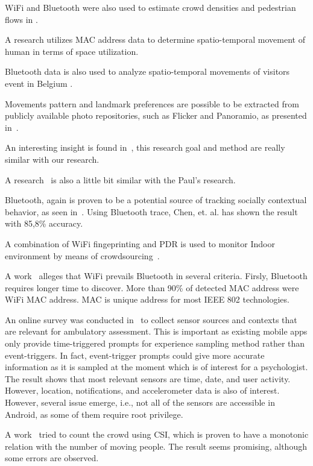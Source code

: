 \documentclass{article}
\begin{document}
WiFi and Bluetooth were also used to estimate crowd densities and pedestrian flows in \cite{thesis011}.

A research \cite{thesis017} utilizes MAC address data to determine spatio-temporal movement of human in terms of space utilization.

Bluetooth data is also used to analyze spatio-temporal movements of visitors event in Belgium \cite{thesis016}.

Movements pattern and landmark preferences are possible to be extracted from publicly available photo repositories, such as Flicker and Panoramio, as presented in~\cite{thesis026}.

An interesting insight is found in~\cite{thesis031}, this research goal and method are really similar with our research.

A research~\cite{thesis030} is also a little bit similar with the Paul's research.

Bluetooth, again is proven to be a potential source of tracking socially contextual behavior, as seen in~\cite{thesis028}. Using Bluetooth trace, Chen, et. al. has shown the result with 85,8\% accuracy.

A combination of WiFi fingeprinting and PDR is used to monitor Indoor environment by means of crowdsourcing~\cite{thesis020}.

A work~\cite{thesis009} alleges that WiFi prevails Bluetooth in several criteria. Firsly, Bluetooth requires longer time to discover. More than 90\% of detected MAC address were WiFi MAC address. MAC is unique address for most IEEE 802 technologies.

An online survey was conducted in~\cite{thesis001} to collect sensor sources and contexts that are relevant for ambulatory assessment. This is important as existing mobile apps only provide time-triggered prompts for experience sampling method rather than event-triggers. In fact, event-trigger prompts could give more accurate information as it is sampled at the moment which is of interest for a psychologist. The result shows that most relevant sensors are time, date, and user activity. However, location, notifications, and accelerometer data is also of interest. However, several issue emerge, i.e., not all of the sensors are accessible in Android, as some of them require root privilege.

A work~\cite{thesis006} tried to count the crowd using CSI, which is proven to have a monotonic relation with the number of moving people. The result seems promising, although some errors are observed.
\end{document}
